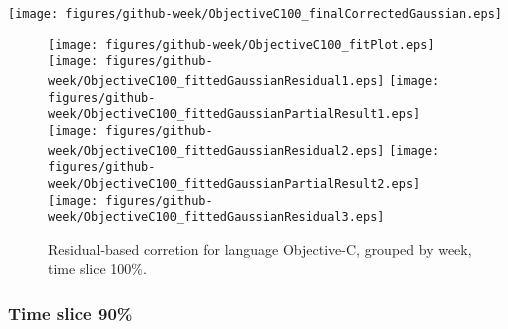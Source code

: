 \begin{center}
{\texttt{[image: figures/github-week/ObjectiveC100\_finalCorrectedGaussian.eps]}}
\end{center}

\FloatBarrier

\begin{figure}[t]
\centering
{}
{\texttt{[image: figures/github-week/ObjectiveC100\_fitPlot.eps]}}
{\texttt{[image: figures/github-week/ObjectiveC100\_fittedGaussianResidual1.eps]}}
{\texttt{[image: figures/github-week/ObjectiveC100\_fittedGaussianPartialResult1.eps]}}
{\texttt{[image: figures/github-week/ObjectiveC100\_fittedGaussianResidual2.eps]}}
{\texttt{[image: figures/github-week/ObjectiveC100\_fittedGaussianPartialResult2.eps]}}
{\texttt{[image: figures/github-week/ObjectiveC100\_fittedGaussianResidual3.eps]}}
\caption{Residual-based corretion for language Objective-C, grouped by week, time slice 100\%.}
\end{figure}


\FloatBarrier


\subsubsection{Time slice 90\%}

